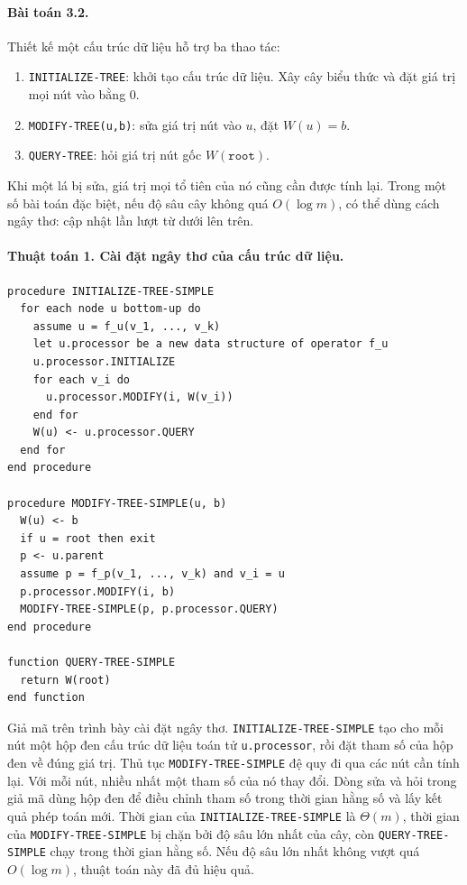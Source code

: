 \documentclass[11pt]{article}
\begin{document}
\paragraph{Bài toán 3.2.}
Thiết kế một cấu trúc dữ liệu hỗ trợ ba thao tác:

\begin{enumerate}
  \item \texttt{INITIALIZE-TREE}: khởi tạo cấu trúc dữ liệu. Xây cây biểu thức
  và đặt giá trị mọi nút vào bằng \(0\).
  \item \texttt{MODIFY-TREE(u,b)}: sửa giá trị nút vào \(u\), đặt \(W(u)=b\).
  \item \texttt{QUERY-TREE}: hỏi giá trị nút gốc \(W(\texttt{root})\).
\end{enumerate}

Khi một lá bị sửa, giá trị mọi tổ tiên của nó cũng cần được tính lại. Trong một
số bài toán đặc biệt, nếu độ sâu cây không quá \(O(\log m)\), có thể dùng cách
ngây thơ: cập nhật lần lượt từ dưới lên trên.

\paragraph{Thuật toán 1. Cài đặt ngây thơ của cấu trúc dữ liệu.}

\begin{verbatim}
procedure INITIALIZE-TREE-SIMPLE
  for each node u bottom-up do
    assume u = f_u(v_1, ..., v_k)
    let u.processor be a new data structure of operator f_u
    u.processor.INITIALIZE
    for each v_i do
      u.processor.MODIFY(i, W(v_i))
    end for
    W(u) <- u.processor.QUERY
  end for
end procedure

procedure MODIFY-TREE-SIMPLE(u, b)
  W(u) <- b
  if u = root then exit
  p <- u.parent
  assume p = f_p(v_1, ..., v_k) and v_i = u
  p.processor.MODIFY(i, b)
  MODIFY-TREE-SIMPLE(p, p.processor.QUERY)
end procedure

function QUERY-TREE-SIMPLE
  return W(root)
end function
\end{verbatim}

Giả mã trên trình bày cài đặt ngây thơ. \texttt{INITIALIZE-TREE-SIMPLE} tạo cho
mỗi nút một hộp đen cấu trúc dữ liệu toán tử \texttt{u.processor}, rồi đặt tham
số của hộp đen về đúng giá trị. Thủ tục \texttt{MODIFY-TREE-SIMPLE} đệ quy đi
qua các nút cần tính lại. Với mỗi nút, nhiều nhất một tham số của nó thay đổi.
Dòng sửa và hỏi trong giả mã dùng hộp đen để điều chỉnh tham số trong thời gian
hằng số và lấy kết quả phép toán mới. Thời gian của
\texttt{INITIALIZE-TREE-SIMPLE} là \(\Theta(m)\), thời gian của
\texttt{MODIFY-TREE-SIMPLE} bị chặn bởi độ sâu lớn nhất của cây, còn
\texttt{QUERY-TREE-SIMPLE} chạy trong thời gian hằng số. Nếu độ sâu lớn nhất
không vượt quá \(O(\log m)\), thuật toán này đã đủ hiệu quả.
\end{document}
